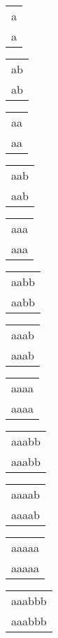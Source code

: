 \begin{tabular}{|l|} \hline
a \\
a \\
\hline
\end{tabular} 
\begin{tabular}{|l|} \hline
ab \\
ab \\
\hline
\end{tabular} 
\begin{tabular}{|l|} \hline
aa \\
aa \\
\hline
\end{tabular} 
\begin{tabular}{|l|} \hline
aab \\
aab \\
\hline
\end{tabular} 
\begin{tabular}{|l|} \hline
aaa \\
aaa \\
\hline
\end{tabular} 
\begin{tabular}{|l|} \hline
aabb \\
aabb \\
\hline
\end{tabular} 
\begin{tabular}{|l|} \hline
aaab \\
aaab \\
\hline
\end{tabular} 
\begin{tabular}{|l|} \hline
aaaa \\
aaaa \\
\hline
\end{tabular} 
\begin{tabular}{|l|} \hline
aaabb \\
aaabb \\
\hline
\end{tabular} 
\begin{tabular}{|l|} \hline
aaaab \\
aaaab \\
\hline
\end{tabular} 
\begin{tabular}{|l|} \hline
aaaaa \\
aaaaa \\
\hline
\end{tabular} 
\begin{tabular}{|l|} \hline
aaabbb \\
aaabbb \\
\hline
\end{tabular} 
